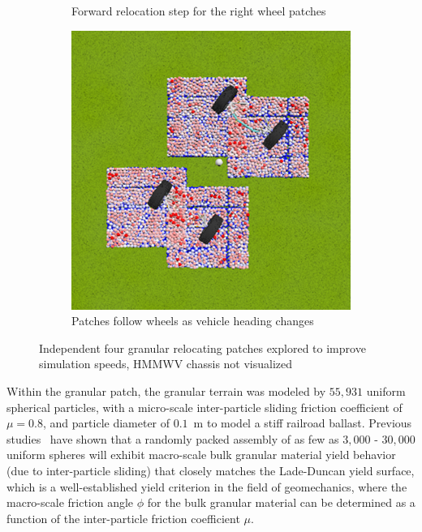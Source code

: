 \documentclass[12pt,onecolumn]{report}
\begin{document}
\begin{figure}
\begin{subfigure}[b]{0.32\textwidth}
		\caption{\small Forward relocation step for the right wheel patches}   
		\label{fig:4PatchB}
	\end{subfigure}
	\hfill
	\begin{subfigure}[b]{0.32\textwidth}
		\centering
		\includegraphics[width=\linewidth]{Figs/4patch3.png}
		\caption{\small Patches follow wheels as vehicle heading changes}   
		\label{fig:4PatchC}
	\end{subfigure}
	\caption{\small Independent four granular relocating patches explored to improve simulation speeds, HMMWV chassis not visualized}
	\label{fig:4Patch}
\end{figure}

Within the granular patch, the granular terrain was modeled by $55,931$ uniform spherical particles, with a micro-scale inter-particle sliding friction coefficient of $\mu = 0.8$, and particle diameter of $0.1$~m to model a stiff railroad ballast.  Previous studies~\cite{fleischmannetalGEGE2014} have shown that 
a randomly packed assembly of as few as $3,000$ - $30,000$ uniform spheres will exhibit macro-scale bulk granular material yield behavior (due to inter-particle sliding) that closely matches the Lade-Duncan yield surface, which is a well-established yield criterion in the field of geomechanics, where the macro-scale friction angle $\phi$ for the bulk granular material can be determined as a function of the inter-particle friction coefficient $\mu$.
\end{document}
